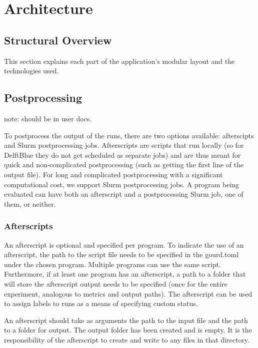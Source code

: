 \pagebreak


\section{Architecture}\label{sec:architecture}

\subsection{Structural Overview}

This section explains each part of the application's modular layout and the technologies used.


\subsection{Postprocessing}
note: should be in user docs.

To postprocess the output of the runs, there are two options available: afterscipts and Slurm postprocessing jobs. 
Afterscripts are scripts that run locally (so for DelftBlue they do not get scheduled as separate jobs) and are 
thus meant for quick and non-complicated postprocessing (such as getting the first line of the output file). For 
long and complicated postprocessing with a significant computational cost, we support Slurm postprocessing jobs.
A program being evaluated can have both an afterscript and a postprocessing Slurm job, one of them, or neither.

\subsubsection{Afterscripts}
An afterscript is optional and specified per program. To indicate the use of an afterscript, the path to the script 
file needs to be specified in the gourd.toml under the chosen program. Multiple programs can use the same script.
Furthermore, if at least one program has an afterscript, a path to a folder that will store the afterscript output 
needs to be specified (once for the entire experiment, analogous to metrics and output paths). The afterscript can 
be used to assign labels to runs as a means of specifying custom status.

An afterscript should take as arguments the path to the input file and the path to a folder for output. The output 
folder has been created and is empty. It is the responsibility of the afterscript to create and write to any files 
in that directory.

